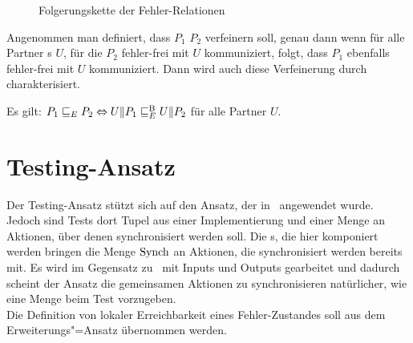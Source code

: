 \begin{figure}[h!tbp]
  \begin{center}
    \caption{Folgerungskette der Fehler-Relationen}
  \label{KommFolgerungskette}
  \end{center}
\end{figure}

Angenommen man definiert, dass $P_1$ $P_2$ verfeinern soll, genau dann wenn für
alle Partner \MEIO{}s $U$, für die $P_2$ fehler-frei mit $U$ kommuniziert,
folgt, dass $P_1$ ebenfalls fehler-frei mit $U$ kommuniziert. Dann wird auch
diese Verfeinerung durch \ERel{} charakterisiert.

\begin{Kor}
  Es gilt: $P_1 \sqsubseteq  _E P_2\Leftrightarrow U\|P_1 \sqsubseteq  _E^\mathrm{B} U\|P_2$ für alle Partner
  $U$.
\end{Kor}

\section{Testing-Ansatz}

Der Testing-Ansatz stützt sich auf den Ansatz, der in~\cite{Vogler2015FailSem}
angewendet wurde. Jedoch sind Tests dort Tupel aus einer Implementierung und
einer Menge an Aktionen, über denen synchronisiert werden soll. Die \MEIO{}s,
die hier komponiert werden bringen die Menge $\mathrm{Synch}$ an Aktionen, die
synchronisiert werden bereits mit. Es wird im Gegensatz
zu~\cite{Vogler2015FailSem} mit Inputs und Outputs gearbeitet und dadurch
scheint der Ansatz die gemeinsamen Aktionen zu synchronisieren natürlicher, wie
eine Menge beim Test vorzugeben.\\
Die Definition von lokaler Erreichbarkeit eines Fehler-Zustandes soll aus dem
Erweiterungs"=Ansatz übernommen werden.

